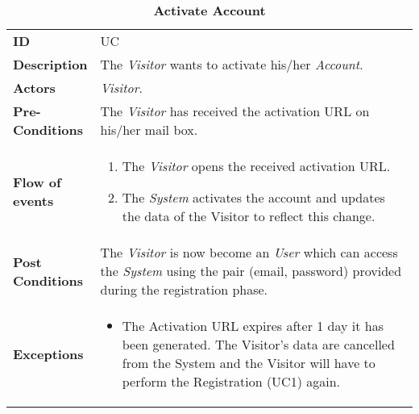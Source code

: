 \begin{longtable}{|p{0.2\linewidth} | p{0.8\linewidth}|}
	\captionsetup{labelformat=empty} %
	\caption{\textbf{Activate Account}} %
	\label{UC_Activate}	\\ \hline
	
	\textbf{ID} & UC\theUseCaseIdCounter \\ \hline
	\textbf{Description} & The \emph{Visitor} wants to activate his/her \emph{Account}. \\ \hline
	\textbf{Actors} & \emph{Visitor}.\\ \hline
	\textbf{Pre-Conditions} & The \emph{Visitor} has received the activation URL on his/her mail box. \\ \hline
	\textbf{Flow of events} & 
	\begin{enumerate}
		\item The \emph{Visitor} opens the received activation URL.
		\item The \emph{System} activates the account and updates the data of the Visitor to reflect this change.
	\end{enumerate}	 \\ \hline
	\textbf{Post Conditions} & The \emph{Visitor} is now become an \emph{User} which can access the \emph{System} using the pair (email, password) provided during the registration phase. \\ \hline
	\textbf{Exceptions} & 
	\begin{itemize}
		\item The Activation URL expires after 1 day it has been generated. The Visitor's data are cancelled from the System and the Visitor will have to perform the Registration (UC1) again.
	\end{itemize} \\ \hline
\end{longtable}

